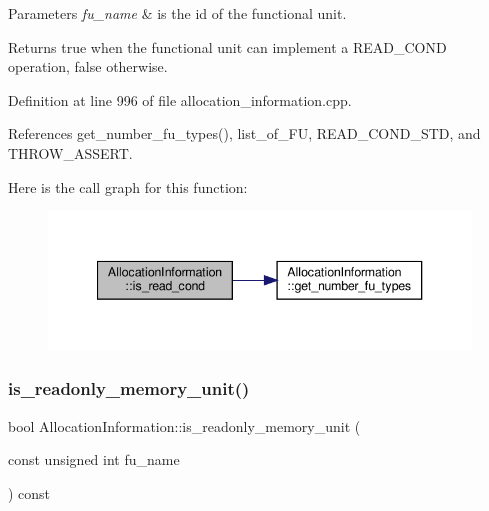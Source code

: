 \begin{DoxyParams}{Parameters}
{\em fu\+\_\+name} & is the id of the functional unit. \\
\hline
\end{DoxyParams}
\begin{DoxyReturn}{Returns}
true when the functional unit can implement a R\+E\+A\+D\+\_\+\+C\+O\+ND operation, false otherwise. 
\end{DoxyReturn}


Definition at line 996 of file allocation\+\_\+information.\+cpp.



References get\+\_\+number\+\_\+fu\+\_\+types(), list\+\_\+of\+\_\+\+FU, R\+E\+A\+D\+\_\+\+C\+O\+N\+D\+\_\+\+S\+TD, and T\+H\+R\+O\+W\+\_\+\+A\+S\+S\+E\+RT.

Here is the call graph for this function\+:
\nopagebreak
\begin{figure}[H]
\begin{center}
\leavevmode
\includegraphics[width=340pt]{d7/d79/classAllocationInformation_ace7726c3d3d4f4115a8c38a7a4f5aa9c_cgraph}
\end{center}
\end{figure}
\mbox{\label{classAllocationInformation_a02860cc61e2f5514c55a2f3db8de70b3}} 
\subsubsection{\texorpdfstring{is\+\_\+readonly\+\_\+memory\+\_\+unit()}{is\_readonly\_memory\_unit()}}
{\footnotesize\ttfamily bool Allocation\+Information\+::is\+\_\+readonly\+\_\+memory\+\_\+unit (\begin{DoxyParamCaption}\item[{const unsigned int}]{fu\+\_\+name }\end{DoxyParamCaption}) const}



